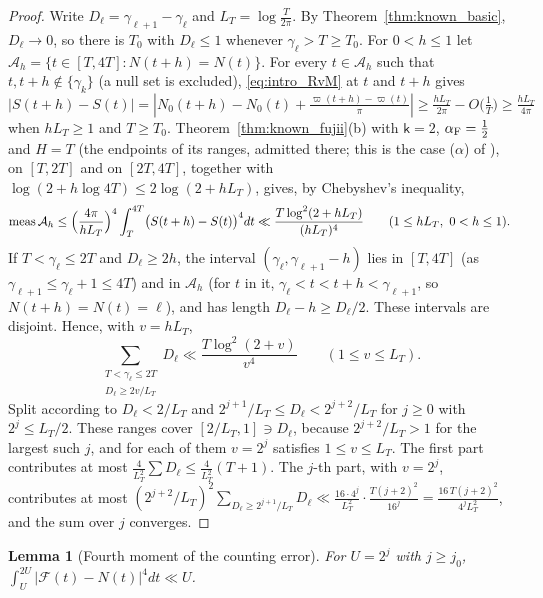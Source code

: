 \documentclass[11pt,a4paper]{article}
\makeatletter
\numberwithin{equation}{section}
\DeclareRobustCommand{\CGref}[1]{\ref{#1}}
\DeclareRobustCommand{\CGeqref}[1]{\eqref{#1}}
\DeclareRobustCommand{\CGcite}[2][]{\if\relax\detokenize{#1}\relax\cite{#2}\else\cite[#1]{#2}\fi}
\let\CG@origref\ref
\let\CG@origeqref\eqref
\newcommand{\CG@gettip}[1]{\@ifundefined{CGTip@#1}{#1}{\csname CGTip@#1\endcsname}}
\newcommand{\CG@getbib}[1]{\@ifundefined{CGBib@#1}{#1}{\csname CGBib@#1\endcsname}}
\DeclareRobustCommand{\CGref}[1]{\pdftooltip{\CG@origref{#1}}{\CG@gettip{#1}}}
\DeclareRobustCommand{\CGeqref}[1]{\pdftooltip{\CG@origeqref{#1}}{\CG@gettip{#1}}}
\DeclareRobustCommand{\CGcite}[2][]{\pdftooltip{\if\relax\detokenize{#1}\relax\cite{#2}\else\cite[#1]{#2}\fi}{\CG@getbib{#2}}}
\newtheorem{lemma}[theorem]{Lemma}
\theoremstyle{definition}
\theoremstyle{remark}
\newcommand{\Nz}{N_0} %
\newcommand{\Fc}{\mathcal F}
\newcommand{\meas}{\operatorname{meas}}
\makeatother
\begin{document}
\begin{proof}
Write $D_\ell=\gamma_{\ell+1}-\gamma_\ell$ and $L_T=\log\frac T{2\pi}$. By Theorem~\CGref{thm:known_basic}, $D_\ell\to0$, so there is $T_0$ with $D_\ell\le1$ whenever $\gamma_\ell>T\ge T_0$. For $0<h\le1$ let $\mathcal A_h=\{t\in[T,4T]:N(t+h)=N(t)\}$. For every $t\in\mathcal A_h$ such that $t,t+h\notin\{\gamma_k\}$ (a null set is excluded), \CGeqref{eq:intro_RvM} at $t$ and $t+h$ gives $|S(t+h)-S(t)|=|\Nz(t+h)-\Nz(t)+\frac{\varpi(t+h)-\varpi(t)}\pi|\ge\frac{hL_T}{2\pi}-O\bigl(\frac1T\bigr)\ge\frac{hL_T}{4\pi}$ when $hL_T\ge1$ and $T\ge T_0$. Theorem~\CGref{thm:known_fujii}(b) with $\mathsf k=2$, $\alpha_{\rm F}=\frac12$ and $H=T$ (the endpoints of its ranges, admitted there; this is the case ($\alpha$) of \CGcite{Fujii1981}), on $[T,2T]$ and on $[2T,4T]$, together with $\log(2+h\log4T)\le2\log(2+hL_T)$, gives, by Chebyshev's inequality,
\begin{equation}
\meas\mathcal A_h\le\Bigl(\frac{4\pi}{hL_T}\Bigr)^4\int_T^{4T}\bigl(S(t+h)-S(t)\bigr)^4dt\ll\frac{T\log^2(2+hL_T)}{(hL_T)^4}\qquad(1\le hL_T,\ 0<h\le1).
\label{eq:disp_24}
\end{equation}
If $T<\gamma_\ell\le2T$ and $D_\ell\ge2h$, the interval $(\gamma_\ell,\gamma_{\ell+1}-h)$ lies in $[T,4T]$ (as $\gamma_{\ell+1}\le\gamma_\ell+1\le4T$) and in $\mathcal A_h$ (for $t$ in it, $\gamma_\ell<t<t+h<\gamma_{\ell+1}$, so $N(t+h)=N(t)=\ell$), and has length $D_\ell-h\ge D_\ell/2$. These intervals are disjoint. Hence, with $v=hL_T$,
\begin{equation}
\sum_{\substack{T<\gamma_\ell\le2T\\ D_\ell\ge2v/L_T}}D_\ell\ll\frac{T\log^2(2+v)}{v^4}\qquad(1\le v\le L_T).
\label{eq:disp_25}
\end{equation}
Split according to $D_\ell<2/L_T$ and $2^{j+1}/L_T\le D_\ell<2^{j+2}/L_T$ for $j\ge0$ with $2^j\le L_T/2$. These ranges cover $[2/L_T,1]\ni D_\ell$, because $2^{j+2}/L_T>1$ for the largest such $j$, and for each of them $v=2^j$ satisfies $1\le v\le L_T$. The first part contributes at most $\frac4{L_T^2}\sum D_\ell\le\frac4{L_T^2}(T+1)$. The $j$-th part, with $v=2^j$, contributes at most $(2^{j+2}/L_T)^2\sum_{D_\ell\ge2^{j+1}/L_T}D_\ell\ll\frac{16\cdot4^j}{L_T^2}\cdot\frac{T(j+2)^2}{16^j}=\frac{16\,T(j+2)^2}{4^jL_T^2}$, and the sum over $j$ converges.
\end{proof}

\begin{lemma}[Fourth moment of the counting error]\label{lem:fourth}
For $U=2^j$ with $j\ge j_0$, $\int_U^{2U}|\Fc(t)-N(t)|^4dt\ll U$.
\end{lemma}
\end{document}
